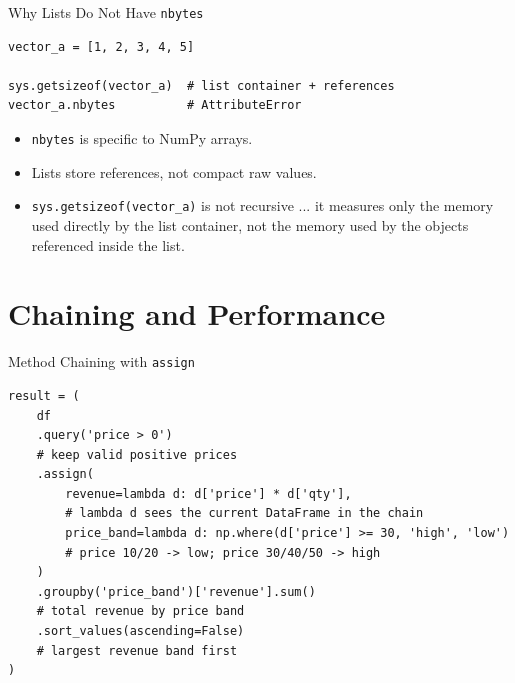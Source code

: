 \documentclass[11pt,aspectratio=43]{beamer}
\begin{document}
{  \begin{frame}[fragile]{Why Lists Do Not Have \texttt{nbytes}}
    \footnotesize
    \begin{lstlisting}
vector_a = [1, 2, 3, 4, 5]

sys.getsizeof(vector_a)  # list container + references
vector_a.nbytes          # AttributeError
    \end{lstlisting}

    \begin{center}
    \end{center}
    \begin{itemize}
      \small
      \item \texttt{nbytes} is specific to NumPy arrays.
      \item Lists store references, not compact raw values.
      \item \texttt{sys.getsizeof(vector\_a)} is not recursive
      \tiny{... it measures only the memory used directly by the list container, not the memory used by the objects referenced inside the list}.
    \end{itemize}
  \end{frame}
}

\section{Chaining and Performance}

\begin{frame}[fragile]{Method Chaining with \texttt{assign}}
  \begin{lstlisting}
result = (
    df
    .query('price > 0')
    # keep valid positive prices
    .assign(
        revenue=lambda d: d['price'] * d['qty'],
        # lambda d sees the current DataFrame in the chain
        price_band=lambda d: np.where(d['price'] >= 30, 'high', 'low')
        # price 10/20 -> low; price 30/40/50 -> high
    )
    .groupby('price_band')['revenue'].sum()
    # total revenue by price band
    .sort_values(ascending=False)
    # largest revenue band first
)
  \end{lstlisting}
\end{frame}
\end{document}
